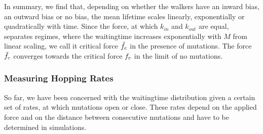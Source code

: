 In summary, we find that, depending on whether the walkers have an inward bias, an outward bias or no bias, the mean lifetime scales linearly, exponentially or quadratically with time.
Since the force, at which $k_{in}$ and $k_{out}$ are equal, separates regimes, where the waitingtime increases exponentially with $M$ from  linear scaling, we call it critical
force $\tilde{f}_c$ in the presence of mutations. The force  $\tilde{f}_c$ 
converges towards the critical force ${f_c}$ in the limit of no mutations.


\subsubsection*{Measuring Hopping Rates}
So far, we have been concerned with the waitingtime distribution given a certain set of rates, at which mutations open or close. These rates depend on the applied force and on the distance between consecutive mutations and have to be determined in simulations. 

